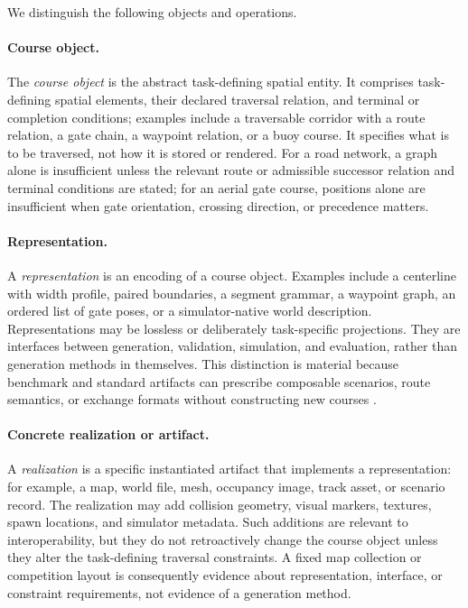 We distinguish the following objects and operations.

\paragraph{Course object.}
The \emph{course object} is the abstract task-defining spatial entity. It comprises
task-defining spatial elements, their declared traversal relation, and terminal or
completion conditions; examples include a traversable corridor with a route relation,
a gate chain, a waypoint relation, or a buoy course. It specifies what is to be
traversed, not how it is stored or rendered. For a road network, a graph alone is
insufficient unless the relevant route or admissible successor relation and terminal
conditions are stated; for an aerial gate course, positions alone are insufficient
when gate orientation, crossing direction, or precedence matters.

\paragraph{Representation.}
A \emph{representation} is an encoding of a course object. Examples include a
centerline with width profile, paired boundaries, a segment grammar, a waypoint
graph, an ordered list of gate poses, or a simulator-native world description.
Representations may be lossless or deliberately task-specific projections. They
are interfaces between generation, validation, simulation, and evaluation, rather
than generation methods in themselves. This distinction is material because
benchmark and standard artifacts can prescribe composable scenarios, route
semantics, or exchange formats without constructing new courses
\cite{Althoff2017CommonRoadComposable,ASAM2024ASAMOpenSCENARIO}.

\paragraph{Concrete realization or artifact.}
A \emph{realization} is a specific instantiated artifact that implements a
representation: for example, a map, world file, mesh, occupancy image, track asset,
or scenario record. The realization may add collision geometry, visual markers,
textures, spawn locations, and simulator metadata. Such additions are relevant to
interoperability, but they do not retroactively change the course object unless they
alter the task-defining traversal constraints. A fixed map collection or competition
layout is consequently evidence about representation, interface, or constraint
requirements, not evidence of a generation method.

